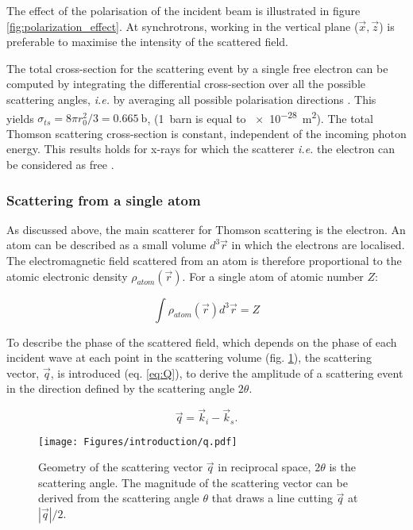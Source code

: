 The effect of the polarisation of the incident beam is illustrated in figure \ref{fig:polarization_effect}.
At synchrotrons, working in the vertical plane ($\vec{x}, \vec{z}$) is preferable to maximise the intensity of the scattered field.

The total cross-section for the scattering event by a single free electron can be computed by integrating the differential cross-section over all the possible scattering angles, \textit{i.e.} by averaging all possible polarisation directions \parencite{Willmott}.
This yields $\sigma_{ts} = 8 \pi r_0^2 /3 = \qty{0.665}{\barn}$, (\qty{1}{barn} is equal to \qty{e-28}{\m^2}).
The total Thomson scattering cross-section is constant, independent of the incoming photon energy.
This results holds for x-rays for which the scatterer \textit{i.e.} the electron can be considered as free \parencite{Willmott}.

\subsubsection{Scattering from a single atom}\label{sec:scattering}

As discussed above, the main scatterer for Thomson scattering is the electron.
An atom can be described as a small volume $d^3\vec{r}$ in which the electrons are localised.
The electromagnetic field scattered from an atom is therefore proportional to the atomic electronic density $\rho_{atom}(\vec{r})$.
For a single atom of atomic number $Z$:

\begin{equation}
    \int \rho_{atom} (\vec{r}) d^3\vec{r} = Z
\end{equation}

To describe the phase of the scattered field, which depends on the phase of each incident wave at each point in the scattering volume (fig. \ref{fig:q}), the scattering vector, $\vec{q}$, is introduced (eq. \ref{eq:Q}), to derive the amplitude of a scattering event in the direction defined by the scattering angle $2\theta$.

\begin{equation}
    \label{eq:Q}
    \vec{q}=\vec{k}_i-\vec{k}_s.
\end{equation}

\begin{figure}[!htb]
    \centering
    \texttt{[image: Figures/introduction/q.pdf]}
    \caption{
    Geometry of the scattering vector $\vec{q}$ in reciprocal space, $2\theta$ is the scattering angle.
    The magnitude of the scattering vector can be derived from the scattering angle $\theta$ that draws a line cutting $\vec{q}$ at $|\vec{q}|/2$.
    }
    \label{fig:q}
\end{figure}

